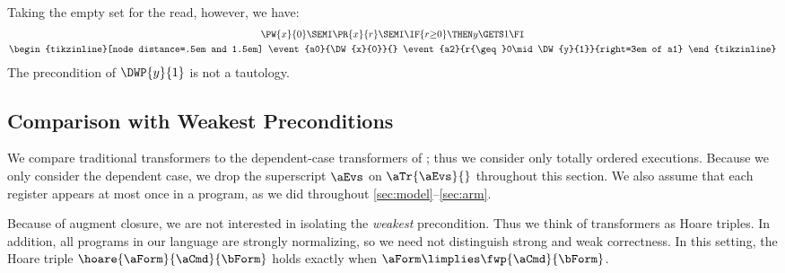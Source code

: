 \begin{example}
  Taking the empty set for the read, however, we have:
  \begin{align*}
    \begin{gathered}[t]
      \PW{x}{0} 
      \SEMI\PR{x}{r} 
      \SEMI\IF{r{\geq}0}\THEN y\GETS1 \FI
      \\
      \hbox{\begin{tikzinline}[node distance=.5em and 1.5em]
          \event{a0}{\DW{x}{0}}{}
          \event{a2}{r{\geq}0\mid\DW{y}{1}}{right=3em of a1}      
        \end{tikzinline}}    
    \end{gathered}
  \end{align*}
  The precondition of $\DWP{y}{1}$ is not a tautology.
\end{example}

\subsection{Comparison with Weakest Preconditions}

We compare traditional transformers to the dependent-case transformers of
; thus we consider only totally ordered executions.
Because we only consider the dependent case, we drop the superscript $\aEvs$
on $\aTr{\aEvs}{}$ throughout this section.  We also assume that each
register appears at most once in a program, as we did throughout
\textsection\ref{sec:model}--\ref{sec:arm}.

Because of augment closure, we are not interested in isolating the
\emph{weakest} precondition.  Thus we think of transformers as Hoare triples.
In addition, all programs in our language are strongly normalizing, so we
need not distinguish strong and weak correctness.  In this setting, the Hoare
triple $\hoare{\aForm}{\aCmd}{\bForm}$ holds exactly when
$\aForm \limplies \fwp{\aCmd}{\bForm}$.

